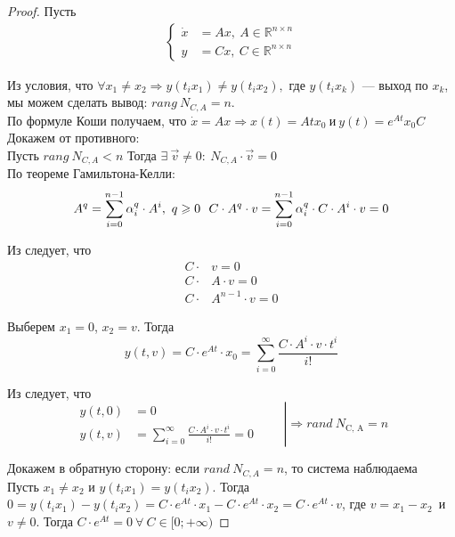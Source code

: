 \documentclass[../../TAU.tex]{subfiles}
\begin{document}
    \begin{proof}
        
        Пусть
        \begin{align*}
            \begin{cases}
                \dot x &= Ax,\ A\in\mathbb{R}^{n\times n} \\
                y &= Cx,\ C\in\mathbb{R}^{n\times n}
            \end{cases}
        \end{align*}

        Из условия, что 
        $
            \forall x_1\neq x_2 \Rightarrow y(t_ix_1) \neq y(t_ix_2),
        $
        где $y(t_ix_k)$ --- выход по $x_k$, мы можем сделать вывод:
        $rang\ N_{C, A}=n$.\\
        По формуле Коши получаем, что 
        $
            \dot x = Ax \Rightarrow x(t) = Atx_0\ \text{и}\ y(t)= e^{At}x_0C
        $\\
        Докажем от противного:\\
        Пусть $rang\ N_{C, A}<n$ Тогда $\exists\ \vec v\neq0:\ N_{C,A}\cdot\vec v = 0$\\
        По теореме Гамильтона-Келли:
        \begin{equation}
            A^q=\sum_{i=0}^{n-1}\alpha_i^q\cdot A^i,\ q\geqslant 0\ \ C\cdot A^q\cdot v=\sum_{i=0}^{n-1}\alpha_i^q\cdot C \cdot A^i \cdot v = 0 
            \label{EQ21}
        \end{equation}

        Из  следует, что
        \begin{align*}
            C\cdot& v = 0 \\
            C\cdot& A \cdot v = 0 \\
            C\cdot& A^{n-1}\cdot v = 0
        \end{align*}


        Выберем $x_1=0$, $x_2=v$. Тогда
        \begin{equation}
            y(t,v)=C\cdot e^{At}\cdot x_0 = \sum_{i=0}^\infty\frac{C\cdot A^i\cdot v\cdot t^i}{i!}
            \label{EQ21_1}
        \end{equation}

        Из  следует, что
        \begin{equation*}
        \left.
            \begin{aligned}
                y(t,0)&=0 \\
                y(t,v)&=\sum_{i=0}^\infty\frac{C\cdot A^i\cdot v\cdot t^i}{i!}=0
            \end{aligned}
        \qquad \right|\Rightarrow rand\ N_\text{C, A}=n
        \end{equation*}

        Докажем в обратную сторону: если $rand\ N_{C, A}=n$, то система наблюдаема\\
        Пусть $x_1\neq x_2$ и $y(t_ix_1)=y(t_ix_2)$.
        Тогда $0=y(t_ix_1)-y(t_ix_2)=C\cdot e^{At}\cdot x_1-C\cdot e^{At}\cdot x_2=C\cdot e^{At}\cdot v$, где $v=x_1-x_2$\ и $v\neq 0$. Тогда $C\cdot e^{At} = 0\ \forall\ C\in [0; +\infty)$
    \end{proof}
\end{document}
